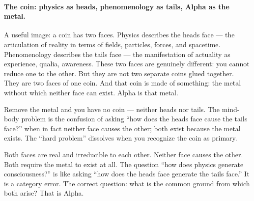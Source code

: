 \documentclass[11pt]{article}
\theoremstyle{remark}
\begin{document}
\paragraph{The coin: physics as heads, phenomenology as tails, Alpha as the metal.}
A useful image: a coin has two faces. Physics describes the heads face --- the
articulation of reality in terms of fields, particles, forces, and spacetime.
Phenomenology describes the tails face --- the manifestation of actuality as experience,
qualia, awareness. These two faces are genuinely different: you cannot reduce one to the
other. But they are not two separate coins glued together. They are two faces of one
coin. And that coin is made of something: the metal without which neither face can
exist. Alpha is that metal.

Remove the metal and you have no coin --- neither heads nor tails. The mind-body
problem is the confusion of asking ``how does the heads face cause the tails face?''
when in fact neither face causes the other; both exist because the metal exists. The
``hard problem'' dissolves when you recognize the coin as primary.

\begin{tcolorbox}[colback=blue!4,colframe=blue!40!black,
  title={Physics / Alpha / Consciousness}]
\begin{center}
\end{center}
\smallskip\noindent
Both faces are real and irreducible to each other. Neither face causes the other.
Both require the metal to exist at all. The question ``how does physics generate
consciousness?'' is like asking ``how does the heads face generate the tails face.''
It is a category error. The correct question: what is the common ground from which
both arise? That is Alpha.
\end{tcolorbox}
\end{document}

